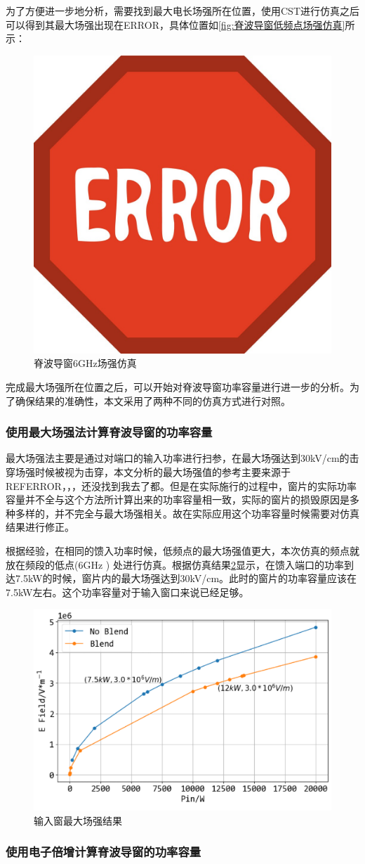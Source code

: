 \documentclass[master]{thesis-uestc}
\begin{document}
为了方便进一步地分析，需要找到最大电长场强所在位置，使用CST进行仿真之后可以得到其最大场强出现在ERROR，具体位置如\ref{fig:脊波导窗低频点场强仿真}所示：
\begin{figure}[!htb]
    \centering
    \includegraphics[width=0.2\linewidth]{pic/ERROR.jpg}
    \caption{脊波导窗6GHz场强仿真}
    \label{fig:脊波导窗6GHz场强仿真}
\end{figure}

完成最大场强所在位置之后，可以开始对脊波导窗功率容量进行进一步的分析。为了确保结果的准确性，本文采用了两种不同的仿真方式进行对照。
\subsubsection{使用最大场强法计算脊波导窗的功率容量}
最大场强法主要是通过对端口的输入功率进行扫参，在最大场强达到30kV/cm的击穿场强时候被视为击穿，本文分析的最大场强值的参考主要来源于REFERROR，，，还没找到我去了都。但是在实际施行的过程中，窗片的实际功率容量并不全与这个方法所计算出来的功率容量相一致，实际的窗片的损毁原因是多种多样的，并不完全与最大场强相关。故在实际应用这个功率容量时候需要对仿真结果进行修正。

根据经验，在相同的馈入功率时候，低频点的最大场强值更大，本次仿真的频点就放在频段的低点(6GHz ) 处进行仿真。根据仿真结果\ref{fig:输入窗最大场强结果}显示，在馈入端口的功率到达7.5kW的时候，窗片内的最大场强达到30kV/cm。此时的窗片的功率容量应该在7.5kW左右。这个功率容量对于输入窗口来说已经足够。
\begin{figure}[!htb]
    \centering
    \includegraphics[width=0.5\linewidth]{pic/chapter3/脊波导最大场强.png}
    \caption{输入窗最大场强结果}
    \label{fig:输入窗最大场强结果}
\end{figure}
\subsubsection{使用电子倍增计算脊波导窗的功率容量}
\end{document}

